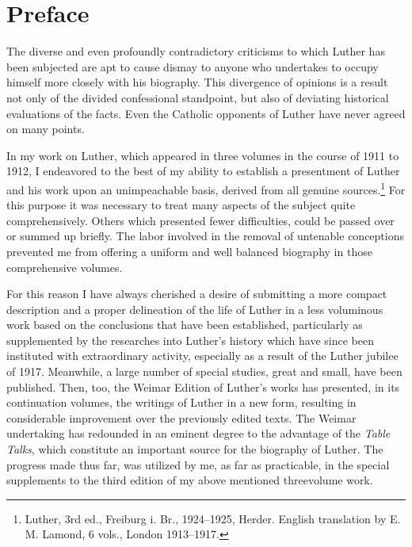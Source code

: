 \chapter*{Preface} %

The diverse and even profoundly contradictory criticisms to which
Luther has been subjected are apt to cause dismay to anyone who
undertakes to occupy himself more closely with his biography. This
divergence of opinions is a result not only of the divided confessional standpoint, but also of deviating historical evaluations of the
facts. Even the Catholic opponents of Luther have never agreed on many points.

In my work on Luther, which appeared in three volumes in the course of 1911 to 1912,
I endeavored to the best of my ability to establish a presentment of Luther and his work upon an unimpeachable basis,
derived from all genuine sources.\footnote{Luther, 3rd ed., Freiburg i. Br., 1924--1925, Herder. English translation by E. M. Lamond, 6 vols., London 1913--1917.}
For this purpose it was necessary to treat many aspects of the subject quite comprehensively.
Others which presented fewer difficulties, could be passed over
or summed up briefly. The labor involved in the removal of untenable
conceptions prevented me from offering a uniform and well balanced biography in those comprehensive volumes.

For this reason I have always cherished a desire of submitting a
more compact description and a proper delineation of the life of
Luther in a less voluminous work based on the conclusions that
have been established, particularly as supplemented by the researches
into Luther’s history which have since been instituted with extraordinary activity, especially as a result of the Luther jubilee of
1917. Meanwhile, a large number of special studies, great and small,
have been published. Then, too, the Weimar Edition of Luther’s
works has presented, in its continuation volumes, the writings of Luther
in a new form, resulting in considerable improvement over the
previously edited texts. The Weimar undertaking has redounded in
an eminent degree to the advantage of the \textit{Table Talks}, which constitute an important source for the biography of Luther.
The progress made thus far, was utilized by me, as far as practicable, in the special supplements to the third edition of my above mentioned threevolume work.

